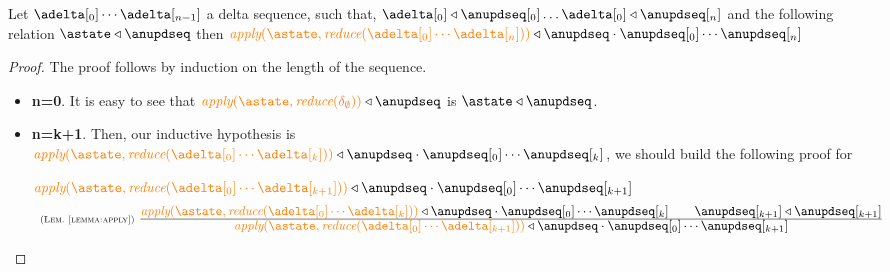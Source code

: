 \begin{lemma}\label{lemma:storechanged} Let $\adelta[_0]\cdots\adelta[_{n-1}]$ a delta sequence, such that, $\adelta[_0] \triangleleft \anupdseq[_0] \ldots \adelta[_0] \triangleleft \anupdseq[_n]$ and the following relation $\astate \triangleleft \anupdseq$ then $\iapply{\astate}{\ireduce{\adelta[_0]\cdots\adelta[_n]}}\triangleleft \anupdseq \cdot \anupdseq[_0]\cdots\anupdseq[_n]$
\end{lemma}

\begin{proof} The proof follows by induction on the length of the sequence.

\begin{itemize}
   \item{\bf n=0}. It is easy to see that $\iapply{\astate}{\ireduce{\emptydelta}}\triangleleft \anupdseq$ is $\astate \triangleleft \anupdseq$.
   \item{\bf n=k+1}. Then, our inductive hypothesis is $\iapply{\astate}{\ireduce{\adelta[_0]\cdots\adelta[_k]}}\triangleleft \anupdseq \cdot \anupdseq[_0]\cdots\anupdseq[_k]$, we should build the following proof for 
							
						$\iapply{\astate}{\ireduce{\adelta[_0]\cdots\adelta[_{k+1}]}}\triangleleft \anupdseq \cdot \anupdseq[_0]\cdots\anupdseq[_{k+1}] \ $
					\[
						  \mathrulean{\lemref{lemma:apply}}
						  {
								\iapply{\astate}{\ireduce{\adelta[_0]\cdots\adelta[_k]}}\triangleleft \anupdseq \cdot \anupdseq[_0]\cdots\anupdseq[_k]
								\quad \quad 
								\anupdseq[_{k+1}]\triangleleft\anupdseq[_{k+1}] 							
							}
  						{\iapply{\astate}{\ireduce{\adelta[_0]\cdots\adelta[_{k+1}]}}\triangleleft \anupdseq \cdot \anupdseq[_0]\cdots\anupdseq[_{k+1}]}  
					\]
	

\end{itemize}


\end{proof}



